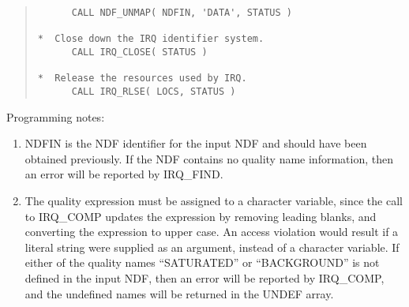 \begin{quote}
\begin{tabbing}
\verb#      CALL NDF_UNMAP( NDFIN, 'DATA', STATUS )          #\\
\verb#                                                       #\\
\verb#*  Close down the IRQ identifier system.               #\\
\verb#      CALL IRQ_CLOSE( STATUS )                         #\\
\verb#                                                       #\\
\verb#*  Release the resources used by IRQ.                  #\\
\verb#      CALL IRQ_RLSE( LOCS, STATUS )                    #\\

\end{tabbing}
\end{quote}

Programming notes:

\begin{enumerate}

\item NDFIN is the NDF identifier for the input NDF and should have been
obtained previously. If the NDF contains no quality name information, then
an error will be reported by IRQ\_FIND.

\item The quality expression must be assigned to a character variable, since the
call to IRQ\_COMP updates the expression by removing leading blanks, and
converting the expression to upper case. An access violation would result if a
literal string were supplied as an argument, instead of a character variable. If
either of the quality names ``SATURATED'' or ``BACKGROUND'' is not defined in
the input NDF, then an error will be reported by IRQ\_COMP, and the undefined
names will be returned in the UNDEF array. 

\end{enumerate}

\newpage

